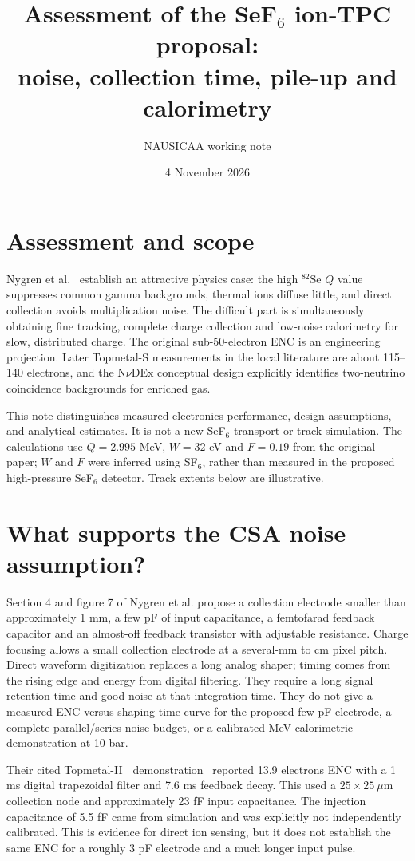 \documentclass[11pt,a4paper]{article}
\title{Assessment of the SeF$_6$ ion-TPC proposal:\\noise, collection time, pile-up and calorimetry}
\author{NAUSICAA working note}
\date{4 November 2026}
\begin{document}
\maketitle

\section{Assessment and scope}
Nygren et al.~\cite{Nygren_2018} establish an attractive physics case:
the high $^{82}$Se $Q$ value suppresses common gamma backgrounds, thermal
ions diffuse little, and direct collection avoids multiplication noise.
The difficult part is simultaneously obtaining fine tracking, complete
charge collection and low-noise calorimetry for slow, distributed charge.
The original sub-50-electron ENC is an engineering projection. Later
Topmetal-S measurements in the local literature are about 115--140
electrons, and the N$\nu$DEx conceptual design explicitly identifies
two-neutrino coincidence backgrounds for enriched gas.

This note distinguishes measured electronics performance, design assumptions,
and analytical estimates. It is not a new SeF$_6$ transport or track simulation.
The calculations use $Q=2.995$ MeV, $W=32$ eV and $F=0.19$ from the original
paper; $W$ and $F$ were inferred using SF$_6$, rather than measured in the
proposed high-pressure SeF$_6$ detector. Track extents below are illustrative.

\section{What supports the CSA noise assumption?}
Section 4 and figure 7 of Nygren et al. propose a collection electrode smaller
than approximately 1 mm, a few pF of input capacitance, a femtofarad feedback
capacitor and an almost-off feedback transistor with adjustable resistance.
Charge focusing allows a small collection electrode at a several-mm to cm
pixel pitch. Direct waveform digitization replaces a long analog shaper;
timing comes from the rising edge and energy from digital filtering. They
require a long signal retention time and good noise at that integration time.
They do not give a measured ENC-versus-shaping-time curve for the proposed
few-pF electrode, a complete parallel/series noise budget, or a calibrated
MeV calorimetric demonstration at 10 bar.

Their cited Topmetal-II$^-$ demonstration~\cite{An2016TopmetalII} reported
13.9 electrons ENC with a 1 ms digital trapezoidal filter and 7.6 ms feedback
decay. This used a $25\times25~\mu$m collection node and approximately
23 fF input capacitance. The injection capacitance of 5.5 fF came from
simulation and was explicitly not independently calibrated. This is evidence
for direct ion sensing, but it does not establish the same ENC for a roughly
3 pF electrode and a much longer input pulse.
\end{document}
